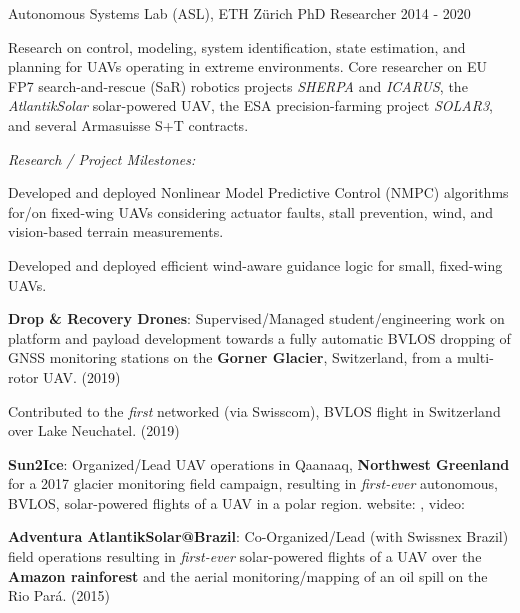 \begin{cventries}
\cvexpentry
  	{Autonomous Systems Lab (ASL), ETH Z\"{u}rich} %
  	{PhD Researcher} %
    {} %
    {2014 - 2020} %
    {
      \begin{cvitems} %
      	\item Research on control, modeling, system identification, state estimation, and planning for UAVs operating in extreme environments. Core researcher on EU FP7 search-and-rescue (SaR) robotics projects \emph{SHERPA} and \emph{ICARUS}, the \emph{AtlantikSolar} solar-powered UAV, the ESA precision-farming project \emph{SOLAR3}, and several Armasuisse S+T contracts. %
		\item[] \hspace{-1.2em} \emph{Research / Project Milestones:}
		\item Developed and deployed Nonlinear Model Predictive Control (NMPC) algorithms for/on fixed-wing UAVs considering actuator faults, stall prevention, wind, and vision-based terrain measurements.
		\item Developed and deployed efficient wind-aware guidance logic for small, fixed-wing UAVs. 
		\item \textbf{Drop \& Recovery Drones}: Supervised/Managed student/engineering work on platform and payload development towards a fully automatic BVLOS dropping of GNSS monitoring stations on the \textbf{Gorner Glacier}, Switzerland, from a multi-rotor UAV. (2019) 
		\item Contributed to the \emph{first} networked (via Swisscom), BVLOS flight in Switzerland over Lake Neuchatel. (2019) 
		\item \textbf{Sun2Ice}: Organized/Lead UAV operations in Qaanaaq, \textbf{Northwest Greenland} for a 2017 glacier monitoring field campaign, resulting in \emph{first-ever} autonomous, BVLOS, solar-powered flights of a UAV in a polar region. website: , video: 
		\item \textbf{Adventura AtlantikSolar@Brazil}: Co-Organized/Lead (with Swissnex Brazil) field operations resulting in \emph{first-ever} solar-powered flights of a UAV over the \textbf{Amazon rainforest} and the aerial monitoring/mapping of an oil spill on the Rio Par\'{a}. (2015) 

\end{cvitems}}
\end{cventries}
